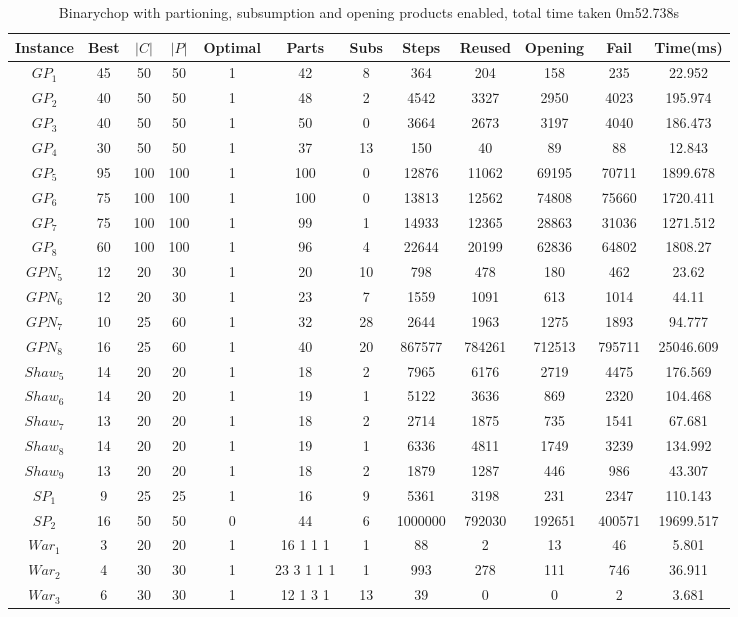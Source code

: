 \begin{table}[H]
\begin{tabular}{|c|c|c|c|c|c|c|c|c|c|c|c|} \hline
Instance&Best&$|C|$&$|P|$&Optimal&Parts&Subs&Steps&Reused&Opening&Fail&Time(ms) \\\hline
$GP_1$&45&50&50&1&42 &8&364&204&158&235&22.952\\ 
$GP_2$&40&50&50&1&48 &2&4542&3327&2950&4023&195.974\\ 
$GP_3$&40&50&50&1&50 &0&3664&2673&3197&4040&186.473\\ 
$GP_4$&30&50&50&1&37 &13&150&40&89&88&12.843\\ 
$GP_5$&95&100&100&1&100 &0&12876&11062&69195&70711&1899.678\\ 
$GP_6$&75&100&100&1&100 &0&13813&12562&74808&75660&1720.411\\ 
$GP_7$&75&100&100&1&99 &1&14933&12365&28863&31036&1271.512\\ 
$GP_8$&60&100&100&1&96 &4&22644&20199&62836&64802&1808.27\\ 
$GPN_5$&12&20&30&1&20 &10&798&478&180&462&23.62\\ 
$GPN_6$&12&20&30&1&23 &7&1559&1091&613&1014&44.11\\ 
$GPN_7$&10&25&60&1&32 &28&2644&1963&1275&1893&94.777\\ 
$GPN_8$&16&25&60&1&40 &20&867577&784261&712513&795711&25046.609\\ 
$Shaw_5$&14&20&20&1&18 &2&7965&6176&2719&4475&176.569\\ 
$Shaw_6$&14&20&20&1&19 &1&5122&3636&869&2320&104.468\\ 
$Shaw_7$&13&20&20&1&18 &2&2714&1875&735&1541&67.681\\ 
$Shaw_8$&14&20&20&1&19 &1&6336&4811&1749&3239&134.992\\ 
$Shaw_9$&13&20&20&1&18 &2&1879&1287&446&986&43.307\\ 
$SP_1$&9&25&25&1&16 &9&5361&3198&231&2347&110.143\\ 
$SP_2$&16&50&50&0&44 &6&1000000&792030&192651&400571&19699.517\\ 
$War_1$&3&20&20&1&16 1 1 1 &1&88&2&13&46&5.801\\ 
$War_2$&4&30&30&1&23 3 1 1 1 &1&993&278&111&746&36.911\\ 
$War_3$&6&30&30&1&12 1 3 1 &13&39&0&0&2&3.681\\ 
\hline
\end{tabular}
\caption{ Binarychop with partioning, subsumption and opening products enabled, total time taken 0m52.738s}
\end{table}
